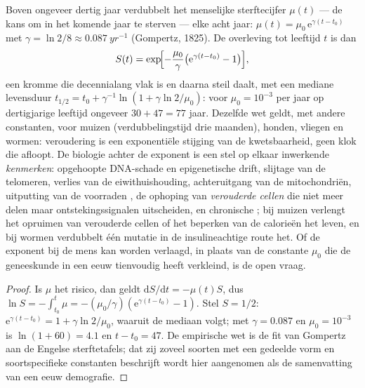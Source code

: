 \begin{proposition}\label{prop:b3:stem-cells:gompertz}
Boven ongeveer dertig jaar verdubbelt het menselijke sterftecijfer
$\mu(t)$ --- de kans om in het komende jaar te sterven --- elke acht
jaar: $\mu(t) =
\mu_{0}\,\mathrm{e}^{\gamma(t - t_{0})}$ met $\gamma = \ln 2/8 \approx
\qty{0.087}{yr^{-1}}$ (Gompertz, 1825). De overleving tot leeftijd $t$ is dan
\[
S(t) = \exp\!\Bigl[-\frac{\mu_{0}}{\gamma}\bigl(\mathrm{e}^{\gamma(t - t_{0})} - 1\bigr)\Bigr],
\]
een kromme die decennialang vlak is en daarna steil daalt, met een
mediane levensduur
$t_{1/2} = t_{0} + \gamma^{-1}\ln(1 + \gamma\ln 2/\mu_{0})$: voor
$\mu_{0} = 10^{-3}$ per jaar op dertigjarige leeftijd ongeveer
$30 + 47 = 77$ jaar. Dezelfde wet geldt, met andere constanten, voor
muizen (verdubbelingstijd drie maanden), honden, vliegen en wormen:
veroudering is een exponentiële stijging van de kwetsbaarheid, geen
klok die afloopt. De biologie achter de exponent is een stel op elkaar
inwerkende \emph{kenmerken}: opgehoopte DNA-schade en epigenetische
drift, slijtage van de telomeren, verlies van de eiwithuishouding,
achteruitgang van de mitochondriën, uitputting van de voorraden
, de ophoping van \emph{verouderde cellen} die niet meer
delen maar ontstekingssignalen uitscheiden, en chronische ;
bij muizen verlengt het opruimen van verouderde cellen of het beperken
van de calorieën het leven, en bij wormen verdubbelt één mutatie in de
insulineachtige route het. Of de exponent bij de mens kan worden
verlaagd, in plaats van de constante $\mu_{0}$ die de geneeskunde in
een eeuw tienvoudig heeft verkleind, is de open vraag.
\end{proposition}
\begin{proof}
Is $\mu$ het risico, dan geldt $\mathrm{d}S/\mathrm{d}t = -\mu(t)S$, dus $\ln S =
-\int_{t_{0}}^{t}\mu = -(\mu_{0}/\gamma)(\mathrm{e}^{\gamma(t-t_{0})} -
1)$. Stel $S = 1/2$: $\mathrm{e}^{\gamma(t-t_{0})} = 1 + \gamma\ln 2/
\mu_{0}$, waaruit de mediaan volgt; met $\gamma = 0.087$ en $\mu_{0} =
10^{-3}$ is $\ln(1 + 60) = 4.1$ en $t - t_{0} = 47$. De empirische wet
is de fit van Gompertz aan de Engelse sterftetafels; dat zij zoveel
soorten met een gedeelde vorm en soortspecifieke constanten beschrijft
wordt hier aangenomen als de samenvatting van een eeuw demografie.
\end{proof}


